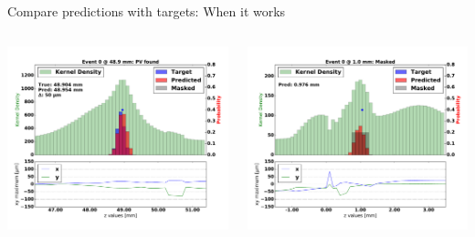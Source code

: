 \begin{frame}{Compare predictions with targets: When it works}
  \begin{columns}[c]
        \begin{center}
           \includegraphics[width=1\textwidth, trim=60 0 60 0]{images/07Jan19_AltCNN4Layer_D35_sp_02.pdf}
       \end{center}
       \begin{center}
           \includegraphics[width=1\textwidth, trim=60 0 60 0]{images/07Jan19_AltCNN4Layer_D35_sp_01.pdf}
       \end{center}
  \end{columns}
\end{frame}


